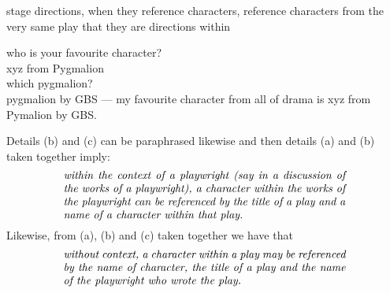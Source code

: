  \begin{noteforfuture}
 stage directions, when they reference characters, reference characters from the very same play that they are directions within
 \end{noteforfuture}

  \begin{noteforfuture}
 who is your favourite character?\\
 xyz from Pygmalion\\
 which pygmalion?\\
 pygmalion by GBS --- my favourite character from all of drama is 
 xyz from Pymalion by GBS.
 \end{noteforfuture}
 
\mynote 
Details (b) and (c) can be paraphrased likewise
and then details (a) and (b) taken together imply: 
\begin{equation}
\label{characterReferenceFromPlaywright}
\text{\parbox{9cm}{\textit{within the context of a playwright
(say in a discussion of the works of a playwright), 
a character within the works of the playwright 
can be referenced by the title of a play 
and a name of a character within that play. }}}\\
\end{equation}
\mynote 
Likewise, from (a), (b) and (c) taken together we have that
\begin{equation} 
\label{absoluteCharacterReferencing}
\text{\parbox{9cm}{\textit{without context, a character within a play 
may be referenced by the name of character, the title of a play and the name of the playwright who wrote the play.}}}
\end{equation}


